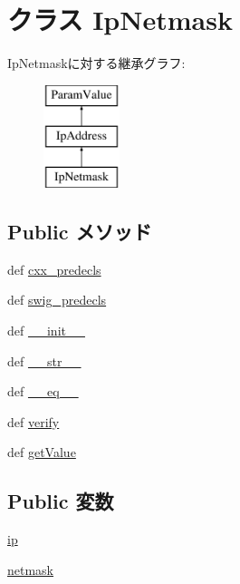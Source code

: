\hypertarget{classm5_1_1params_1_1IpNetmask}{
\section{クラス IpNetmask}
\label{classm5_1_1params_1_1IpNetmask}
}
IpNetmaskに対する継承グラフ:\begin{figure}[H]
\begin{center}
\leavevmode
\includegraphics[height=3cm]{classm5_1_1params_1_1IpNetmask}
\end{center}
\end{figure}
\subsection*{Public メソッド}
\begin{DoxyCompactItemize}
\item 
def \hyperlink{classm5_1_1params_1_1IpNetmask_a0b408a11a14bd1d770e28f71a6e14ab5}{cxx\_\-predecls}
\item 
def \hyperlink{classm5_1_1params_1_1IpNetmask_ab3dbcf5716623eac67a8ccc074fa7e13}{swig\_\-predecls}
\item 
def \hyperlink{classm5_1_1params_1_1IpNetmask_ac775ee34451fdfa742b318538164070e}{\_\-\_\-init\_\-\_\-}
\item 
def \hyperlink{classm5_1_1params_1_1IpNetmask_aa7a4b9bc0941308e362738503137460e}{\_\-\_\-str\_\-\_\-}
\item 
def \hyperlink{classm5_1_1params_1_1IpNetmask_a449f8fd74d358c0ad641b6c6d6917ba0}{\_\-\_\-eq\_\-\_\-}
\item 
def \hyperlink{classm5_1_1params_1_1IpNetmask_aea46c698f871a6aece7a52d69bd684dc}{verify}
\item 
def \hyperlink{classm5_1_1params_1_1IpNetmask_acc340fbd4335fa34f9d57fb454b28ed0}{getValue}
\end{DoxyCompactItemize}
\subsection*{Public 変数}
\begin{DoxyCompactItemize}
\item 
\hyperlink{classm5_1_1params_1_1IpNetmask_afd65cf072a93c93ad52b9f25b341e10b}{ip}
\item 
\hyperlink{classm5_1_1params_1_1IpNetmask_a359f0484d4ac0d41935005644fe6c8b4}{netmask}
\end{DoxyCompactItemize}
